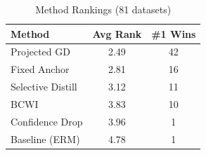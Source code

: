 \begin{table}[t]
\centering
\caption{Method Rankings (81 datasets)}
\label{tab:rankings}
\begin{tabular}{lcc}
\toprule
Method & Avg Rank & \#1 Wins \\
\midrule
Projected GD & 2.49 & 42 \\
Fixed Anchor & 2.81 & 16 \\
Selective Distill & 3.12 & 11 \\
BCWI & 3.83 & 10 \\
Confidence Drop & 3.96 & 1 \\
Baseline (ERM) & 4.78 & 1 \\
\bottomrule
\end{tabular}
\end{table}
